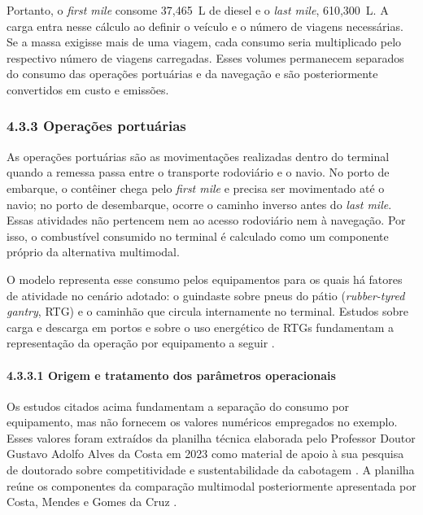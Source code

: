 \documentclass[brazil,]{article}
\let\oldsubsubsection\subsubsection
\renewcommand{\subsubsection}{\Needspace{10\baselineskip}\oldsubsubsection}
\let\oldparagraph\paragraph
\renewcommand{\paragraph}[1]{\Needspace{7\baselineskip}\oldparagraph{#1}\mbox{}}
\begin{document}
Portanto, o \emph{first mile} consome 37,465~L de diesel e o
\emph{last mile}, 610,300~L. A carga entra nesse cálculo ao definir o
veículo e o número de viagens necessárias. Se a massa exigisse mais de
uma viagem, cada consumo seria multiplicado pelo respectivo número de
viagens carregadas. Esses volumes permanecem separados do consumo das
operações portuárias e da navegação e são posteriormente convertidos em
custo e emissões.

\hypertarget{operauxe7uxf5es-portuuxe1rias}{%
\subsubsection{4.3.3 Operações
portuárias}\label{operauxe7uxf5es-portuuxe1rias}}

As operações portuárias são as movimentações realizadas dentro do
terminal quando a remessa passa entre o transporte rodoviário e o navio.
No porto de embarque, o contêiner chega pelo \emph{first mile} e precisa
ser movimentado até o navio; no porto de desembarque, ocorre o caminho
inverso antes do \emph{last mile}. Essas atividades não pertencem nem ao
acesso rodoviário nem à navegação. Por isso, o combustível consumido no
terminal é calculado como um componente próprio da alternativa
multimodal.

O modelo representa esse consumo pelos equipamentos para os quais há
fatores de atividade no cenário adotado: o guindaste sobre pneus do
pátio (\emph{rubber-tyred gantry}, RTG) e o caminhão que circula
internamente no terminal. Estudos sobre carga e descarga em portos e
sobre o uso energético de RTGs fundamentam a representação da operação
por equipamento a seguir \parencite{shipops2022,rtg2017}.

\hypertarget{origem-e-tratamento-dos-parametros-operacionais}{%
\paragraph{4.3.3.1 Origem e tratamento dos parâmetros
operacionais}\label{origem-e-tratamento-dos-parametros-operacionais}}

Os estudos citados acima fundamentam a separação do consumo por
equipamento, mas não fornecem os valores numéricos empregados no
exemplo. Esses valores foram extraídos da planilha técnica elaborada
pelo Professor Doutor Gustavo Adolfo Alves da Costa em 2023 como
material de apoio à sua pesquisa de doutorado sobre competitividade e
sustentabilidade da cabotagem \parencite{workbookdados}. A planilha reúne
os componentes da comparação multimodal posteriormente apresentada por
Costa, Mendes e Gomes da Cruz \parencite{competitiveness2024}.
\end{document}
